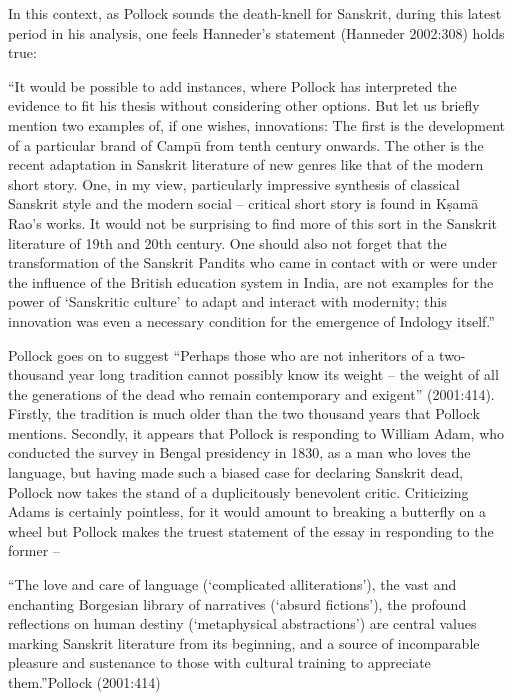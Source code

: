 In this context, as Pollock sounds the death-knell for Sanskrit, during this latest period in his analysis, one feels Hanneder’s statement (Hanneder 2002:308) holds true:

\begin{myquote}
“It would be possible to add instances, where Pollock has interpreted the evidence to fit his thesis without considering other options. But let us briefly mention two examples of, if one wishes, innovations: The first is the development of a particular brand of Campū from tenth century onwards. The other is the recent adaptation in Sanskrit literature of new genres like that of the modern short story. One, in my view, particularly impressive synthesis of classical Sanskrit style and the modern social – critical short story is found in Kṣamā Rao’s works. It would not be surprising to find more of this sort in the Sanskrit literature of 19th and 20th century. One should also not forget that the transformation of the Sanskrit Pandits who came in contact with or were under the influence of the British education system in India, are not examples for the power of ‘Sanskritic culture’ to adapt and interact with modernity; this innovation was even a necessary condition for the emergence of Indology itself.”
\end{myquote}

Pollock goes on to suggest “Perhaps those who are not inheritors of a two-thousand year long tradition cannot possibly know its weight – the weight of all the generations of the dead who remain contemporary and exigent” (2001:414). Firstly, the tradition is much older than the two thousand years that Pollock mentions. Secondly, it appears that Pollock is responding to William Adam, who conducted the survey in Bengal presidency in 1830, as a man who loves the language, but having made such a biased case for declaring Sanskrit dead, Pollock now takes the stand of a duplicitously benevolent critic. Criticizing Adams is certainly pointless, for it would amount to breaking a butterfly on a wheel but Pollock makes the truest statement of the essay in responding to the former – 

\begin{myquote}
“The love and care of language (‘complicated alliterations’), the vast and enchanting  Borgesian library of narratives (‘absurd fictions’), the profound reflections on human destiny (‘metaphysical abstractions’) are central values marking Sanskrit literature from its beginning, and a source of incomparable pleasure and sustenance to those with cultural training to appreciate them.”\hfill Pollock (2001:414)
\end{myquote}

